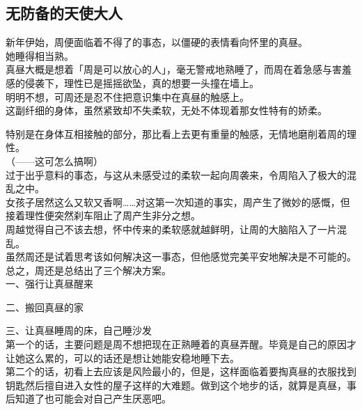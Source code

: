\subsection{无防备的天使大人}

新年伊始，周便面临着不得了的事态，以僵硬的表情看向怀里的真昼。\\

她睡得相当熟。\\

真昼大概是想着「周是可以放心的人」，毫无警戒地熟睡了，而周在着急感与害羞感的侵袭下，理性已是摇摇欲坠，真的想要一头撞在墙上。\\

明明不想，可周还是忍不住把意识集中在真昼的触感上。\\

这副纤细的身体，虽然紧致却不失柔软，无处不体现着那女性特有的娇柔。

特别是在身体互相接触的部分，那比看上去更有重量的触感，无情地磨削着周的理性。\\

（——这可怎么搞啊）\\

过于出乎意料的事态，与这从未感受过的柔软一起向周袭来，令周陷入了极大的混乱之中。\\

女孩子居然这么又软又香啊……对这第一次知道的事实，周产生了微妙的感慨，但接着理性便突然刹车阻止了周产生非分之想。\\

周越觉得自己不该去想，怀中传来的柔软感就越鲜明，让周的大脑陷入了一片混乱。\\

虽然周还是试着思考该如何解决这一事态，但他感觉完美平安地解决是不可能的。\\

总之，周还是总结出了三个解决方案。\\

一、强行让真昼醒来

二、搬回真昼的家

三、让真昼睡周的床，自己睡沙发\\

第一个的话，主要问题是周不想把现在正熟睡着的真昼弄醒。毕竟是自己的原因才让她这么累的，可以的话还是想让她能安稳地睡下去。\\

第二个的话，初看上去应该是风险最小的，但是，这样面临着要掏真昼的衣服找到钥匙然后擅自进入女性的屋子这样的大难题。做到这个地步的话，就算是真昼，事后知道了也可能会对自己产生厌恶吧。\\

